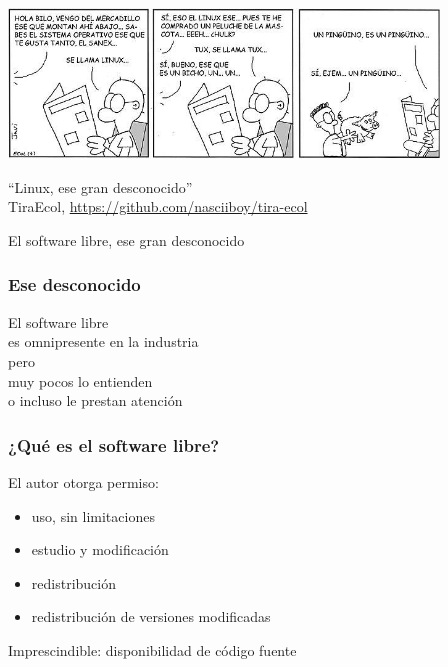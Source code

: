 \documentclass[17pt,aspectratio=169]{beamer}
\begin{document}

\begin{frame}

\includegraphics[height=4cm]{figs/tiraecol-5}

\begin{flushright}
``Linux, ese gran desconocido'' \\
{\small TiraEcol, \url{https://github.com/nasciiboy/tira-ecol}}
\end{flushright}

\vspace{.5cm}

\begin{center}
{\huge
El software libre, ese gran desconocido
}
\end{center}

\end{frame}


\begin{frame}
\frametitle{Ese desconocido}

\begin{center}
  {\Large
  El software libre \\
  es omnipresente en la industria \\
  pero \\
  muy pocos lo entienden \\
  o incluso le prestan atención \\
  }
\end{center}

\end{frame}


\begin{frame}
\frametitle{¿Qué es el software libre?}

El autor otorga permiso:

\begin{itemize}
\item uso, sin limitaciones
\item estudio y modificación
\item redistribución
\item redistribución de versiones modificadas
\end{itemize}

Imprescindible: disponibilidad de código fuente

\end{frame}
\end{document}
